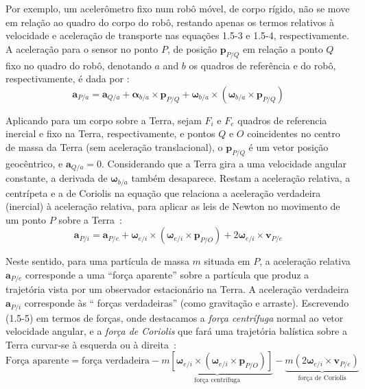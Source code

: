Por exemplo, um acelerômetro fixo num robô móvel, de corpo rígido, não se move em relação ao quadro do corpo do robô, restando apenas os termos relativos à velocidade e aceleração de transporte nas equações 1.5-3 e 1.5-4, respectivamente. A aceleração para o sensor no ponto \(P\), de posição \(\mathbf{p}_{P/Q}\) em relação a ponto \(Q\) fixo no quadro do robô, denotando \(a\) and \(b\) os quadros de referência e do robô, respectivamente, é dada por \cite{Stevens2016}:
\begin{equation*}
    {\mathbf{a}_{P/a}} = {\mathbf{a}_{Q/a}} + {\mathbf{\alpha}_{b/a}}\!\times\!{\mathbf{p}_{P/Q}} + {\mathbf{\omega}_{b/a}}\!\times\!\left({\mathbf{\omega}_{b/a}}\!\times\!{\mathbf{p}_{P/Q}}\right)
\end{equation*}

Aplicando para um corpo sobre a Terra, sejam \(F_{i}\)  e  \(F_{e}\) quadros de referencia inercial e fixo na Terra, respectivamente, e pontos \(Q\) e \(O\) coincidentes no centro de massa da Terra (sem aceleração translacional), o \(\mathbf{p}_{P/Q}\) é um vetor posição geocêntrico, e \(\mathbf{a}_{Q/a}=0\). Considerando que a Terra gira a uma velocidade angular constante, a derivada de \(\mathbf{\omega}_{b/a}\) também desaparece. Restam a aceleração relativa, a centrípeta e a de Coriolis na equação que relaciona a aceleração verdadeira (inercial) à aceleração relativa, para aplicar as leis de Newton no movimento de um ponto \(P\) sobre a Terra~\cite{Stevens2016}:
\begin{equation*} \tag{1.5-5}
    {\mathbf{a}_{P/i}} = {\mathbf{a}_{P/e}} + {\mathbf{\omega}_{e/i}}\!\times\!\left({\mathbf{\omega}_{e/i}}\!\times\!{\mathbf{p}_{P/O}}\right) + 2\mathbf{\omega}_{e/i}\!\times\!\mathbf{v}_{P/e}
\end{equation*}

Neste sentido, para uma partícula de massa \(m\) situada em \(P\), a aceleração relativa \(\mathbf{a}_{P/e}\) corresponde a uma ``força aparente'' sobre a partícula que produz a trajetória vista por um observador estacionário na Terra. A aceleração verdadeira \(\mathbf{a}_{P/i}\) corresponde às `` forças verdadeiras'' (como gravitação e arraste).  Escrevendo (1.5-5) em termos de forças, onde destacamos a \textit{força centrífuga} normal ao vetor velocidade angular, e a \textit{força de Coriolis}\footnotemark{} que fará uma trajetória balística sobre a Terra curvar-se à esquerda ou à direita~\cite{Stevens2016}:
\begin{equation*}
    \text{Força aparente} = \text{força verdadeira} - \underbrace{m \left[{\mathbf{\omega}_{e/i}}\!\times\!\left({\mathbf{\omega}_{e/i}}\!\times\!{\mathbf{p}_{P/O}}\right)\right]}_{\text{força centrífuga}} - \underbrace{m \left( 2{\mathbf{\omega}_{e/i}}\!\times\!{\mathbf{v}_{P/e}}\right)}_{\text{força de Coriolis}}
\end{equation*}

